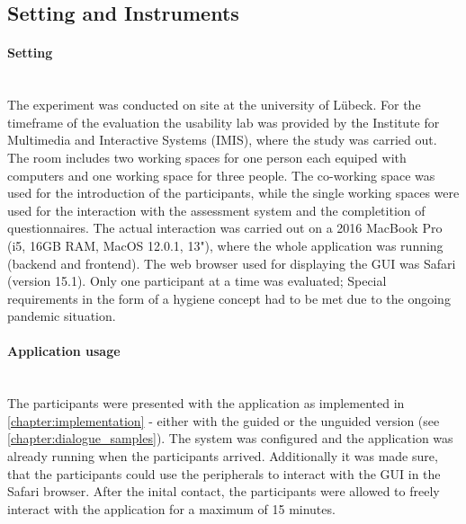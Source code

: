 \documentclass[11pt,a4paper,english]{scrreprt}
\begin{document}
\subsection{Setting and Instruments}
\paragraph{Setting}\mbox{} \\
The experiment was conducted on site at the university of Lübeck. For the timeframe of the evaluation the usability lab was provided by the Institute for Multimedia and Interactive Systems (IMIS), where the study was carried out. The room includes two working spaces for one person each equiped with computers and one working space for three people. The co-working space was used for the introduction of the participants, while the single working spaces were used for the interaction with the assessment system and the completition of questionnaires. The actual interaction was carried out on a 2016 MacBook Pro (i5, 16GB RAM, MacOS 12.0.1, 13"), where the whole application was running (backend and frontend). The web browser used for displaying the GUI was Safari (version 15.1). Only one participant at a time was evaluated; Special requirements in the form of a hygiene concept had to be met due to the ongoing pandemic situation.

\paragraph{Application usage}\mbox{} \\
The participants were presented with the application as implemented in \autoref{chapter:implementation} - either with the guided or the unguided version (see \autoref{chapter:dialogue_samples}). The system was configured and the application was already running when the participants arrived. Additionally it was made sure, that the participants could use the peripherals to interact with the GUI in the Safari browser. After the inital contact, the participants were allowed to freely interact with the application for a maximum of 15 minutes.
\end{document}
